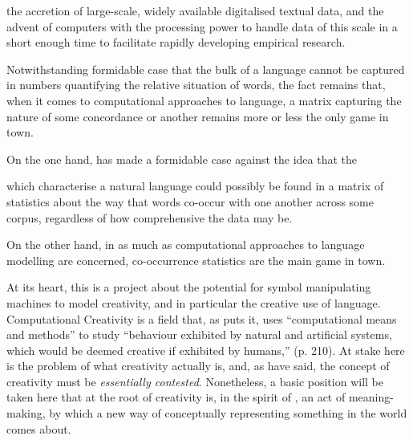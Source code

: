 the accretion of large-scale, widely available digitalised textual data, and the advent of computers with the processing power to handle data of this scale in a short enough time to facilitate rapidly developing empirical research.

Notwithstanding  formidable case that the bulk of a language cannot be captured in numbers quantifying the relative situation of words, the fact remains that, when it comes to computational approaches to language, a matrix capturing the nature of some concordance or another remains more or less the only game in town.

On the one hand, \cite{Chomsky} has made a formidable case against the idea that the

which characterise a natural language could possibly be found in a matrix of statistics about the way that words co-occur with one another across some corpus, regardless of how comprehensive the data may be.

On the other hand, in as much as computational approaches to language modelling are concerned, co-occurrence statistics are the main game in town.


At its heart, this is a project about the potential for symbol manipulating machines to model creativity, and in particular the creative use of language.  Computational Creativity is a field that, as \cite{Wiggins2006b} puts it, uses ``computational means and methods'' to study ``behaviour exhibited by natural and artificial systems, which would be deemed creative if exhibited by humans,'' (p. 210).  At stake here is the problem of what creativity actually is, and, as \cite{Colton} have said, the concept of creativity must be \emph{essentially contested}.  Nonetheless, a basic position will be taken here that at the root of creativity is, in the spirit of \cite{Wittgenstein1953}, an act of meaning-making, by which a new way of conceptually representing something in the world comes about.

